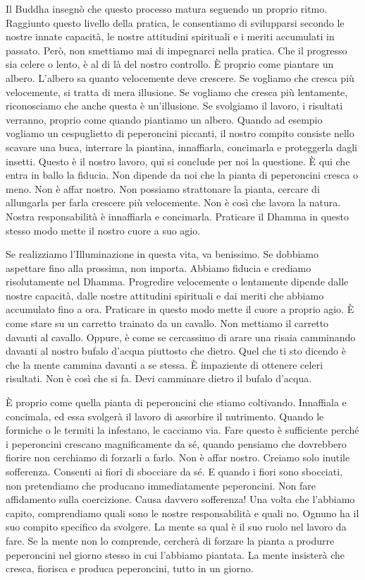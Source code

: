 Il Buddha insegnò che questo processo matura seguendo un proprio ritmo.
Raggiunto questo livello della pratica, le consentiamo di svilupparsi
secondo le nostre innate capacità, le nostre attitudini spirituali e i
meriti accumulati in passato. Però, non smettiamo mai di impegnarci
nella pratica. Che il progresso sia celere o lento, è al di là del
nostro controllo. È proprio come piantare un albero. L'albero sa quanto
velocemente deve crescere. Se vogliamo che cresca più velocemente, si
tratta di mera illusione. Se vogliamo che cresca più lentamente,
riconosciamo che anche questa è un'illusione. Se svolgiamo il lavoro, i
risultati verranno, proprio come quando piantiamo un albero. Quando ad
esempio vogliamo un cespuglietto di peperoncini piccanti, il nostro
compito consiste nello scavare una buca, interrare la piantina,
innaffiarla, concimarla e proteggerla dagli insetti. Questo è il nostro
lavoro, qui si conclude per noi la questione. È qui che entra in ballo
la fiducia. Non dipende da noi che la pianta di peperoncini cresca o
meno. Non è affar nostro. Non possiamo strattonare la pianta, cercare di
allungarla per farla crescere più velocemente. Non è così che lavora la
natura. Nostra responsabilità è innaffiarla e concimarla. Praticare il
Dhamma in questo stesso modo mette il nostro cuore a suo agio.

Se realizziamo l'Illuminazione in questa vita, va benissimo. Se dobbiamo
aspettare fino alla prossima, non importa. Abbiamo fiducia e crediamo
risolutamente nel Dhamma. Progredire velocemente o lentamente dipende
dalle nostre capacità, dalle nostre attitudini spirituali e dai meriti
che abbiamo accumulato fino a ora. Praticare in questo modo mette il
cuore a proprio agio. È come stare su un carretto trainato da un
cavallo. Non mettiamo il carretto davanti al cavallo. Oppure, è come se
cercassimo di arare una risaia camminando davanti al nostro bufalo
d'acqua piuttosto che dietro. Quel che ti sto dicendo è che la mente
cammina davanti a se stessa. È impaziente di ottenere celeri risultati.
Non è così che si fa. Devi camminare dietro il bufalo d'acqua.

È proprio come quella pianta di peperoncini che stiamo coltivando.
Innaffiala e concimala, ed essa svolgerà il lavoro di assorbire il
nutrimento. Quando le formiche o le termiti la infestano, le cacciamo
via. Fare questo è sufficiente perché i peperoncini crescano
magnificamente da sé, quando pensiamo che dovrebbero fiorire non
cerchiamo di forzarli a farlo. Non è affar nostro. Creiamo solo inutile
sofferenza. Consenti ai fiori di sbocciare da sé. E quando i fiori sono
sbocciati, non pretendiamo che producano immediatamente peperoncini. Non
fare affidamento sulla coercizione. Causa davvero sofferenza! Una volta
che l'abbiamo capito, comprendiamo quali sono le nostre responsabilità e
quali no. Ognuno ha il suo compito specifico da svolgere. La mente sa
qual è il suo ruolo nel lavoro da fare. Se la mente non lo comprende,
cercherà di forzare la pianta a produrre peperoncini nel giorno stesso
in cui l'abbiamo piantata. La mente insisterà che cresca, fiorisca e
produca peperoncini, tutto in un giorno.

